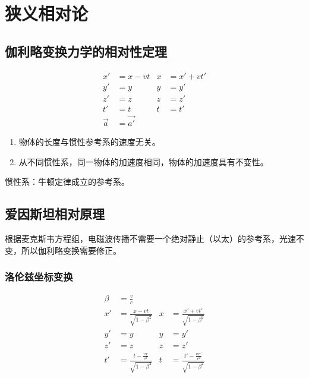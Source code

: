 \chapter{狭义相对论}

\newpage

\section{伽利略变换力学的相对性定理}

\begin{equation}
    \begin{aligned}
        x'      & =x-vt     & x & =x'+vt' \\
        y'      & =y        & y & =y'     \\
        z'      & =z        & z & =z'     \\
        t'      & =t        & t & =t'     \\
        \vec{a} & =\vec{a'}
    \end{aligned}
\end{equation}

\begin{enumerate}
    \item 物体的长度与惯性参考系的速度无关。
    \item 从不同惯性系，同一物体的加速度相同，物体的加速度具有不变性。
\end{enumerate}

惯性系：牛顿定律成立的参考系。

\section{爱因斯坦相对原理}

根据麦克斯韦方程组，电磁波传播不需要一个绝对静止（以太）的参考系，光速不变，所以伽利略变换需要修正。

\subsection{洛伦兹坐标变换}

\begin{equation}
    \begin{aligned}
        \beta & =\frac{v}{c}                                                                                  \\
        x'    & =\frac{x-vt}{\sqrt{1-\beta^2}}             & x & =\frac{x'+vt'}{\sqrt{1-\beta^2}}             \\
        y'    & =y                                         & y & =y'                                          \\
        z'    & =z                                         & z & =z'                                          \\
        t'    & =\frac{t-\frac{vx}{c^2}}{\sqrt{1-\beta^2}} & t & =\frac{t'-\frac{vx'}{c^2}}{\sqrt{1-\beta^2}}
    \end{aligned}
\end{equation}

